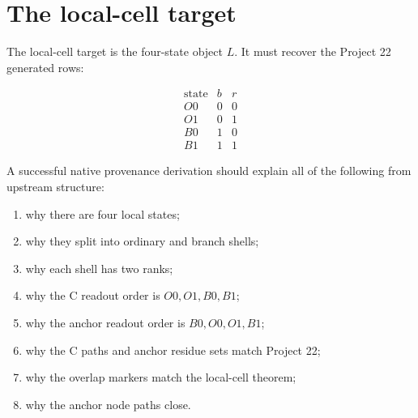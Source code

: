 \section{The local-cell target}

The local-cell target is the four-state object \(L\).  It must recover the Project 22 generated rows:

\[
\begin{array}{c|c|c}
\mathrm{state} & b & r\\
\hline
O0 & 0 & 0\\
O1 & 0 & 1\\
B0 & 1 & 0\\
B1 & 1 & 1
\end{array}
\]

A successful native provenance derivation should explain all of the following from upstream structure:

\begin{enumerate}[label=(\arabic*)]
\item why there are four local states;
\item why they split into ordinary and branch shells;
\item why each shell has two ranks;
\item why the C readout order is \(O0,O1,B0,B1\);
\item why the anchor readout order is \(B0,O0,O1,B1\);
\item why the C paths and anchor residue sets match Project 22;
\item why the overlap markers match the local-cell theorem;
\item why the anchor node paths close.
\end{enumerate}

